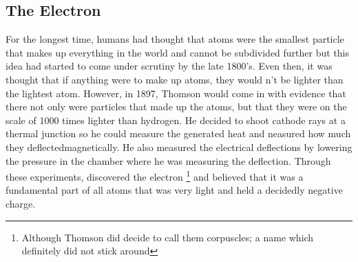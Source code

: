 \subsection{The Electron}

For the longest time, humans had thought that atoms were the smallest particle that makes up everything in the world and cannot be subdivided further\cite{Dalton} but this idea had started to come under scrutiny by the late 1800's.
Even then, it was thought that if anything were to make up atoms, they would n't be lighter than the lightest atom.
However, in 1897, Thomson would come in with evidence that there not only were particles that made up the atoms, but that they were on the scale of 1000 times lighter  than hydrogen.
He decided to shoot cathode rays at a thermal junction so he could measure the generated heat and neasured how much they deflectedmagnetically.
He also measured the electrical deflections by lowering the pressure in the chamber where he was measuring the deflection.
Through these experiments, discovered the electron
\footnote{Although Thomson did decide to call them corpuscles; a name which definitely did not stick around}
and believed that it was a fundamental part of all atoms that was very light and held a decidedly negative charge.\cite{electronDiscovery}

